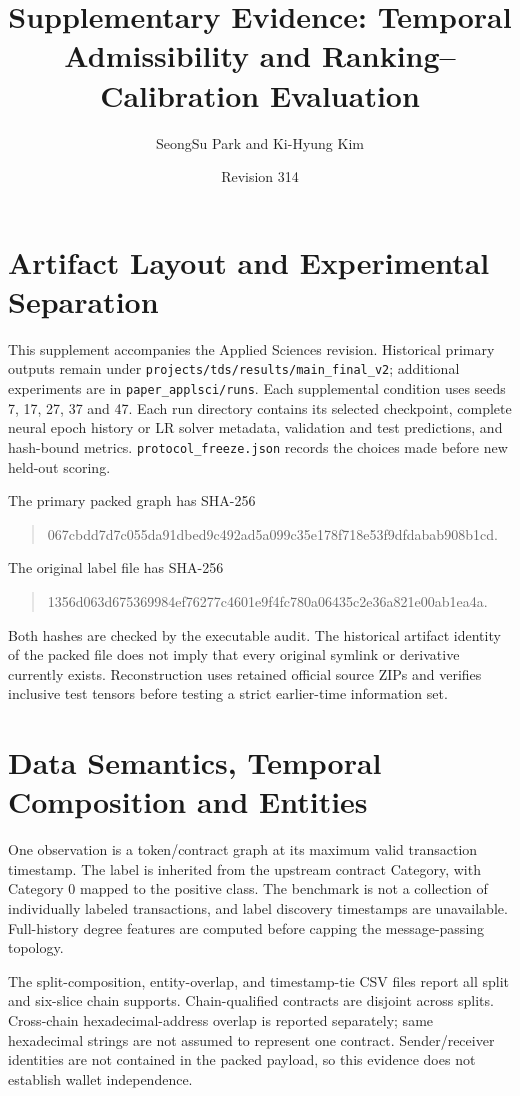\documentclass[11pt]{article}
\title{Supplementary Evidence: Temporal Admissibility and Ranking--Calibration Evaluation}
\author{SeongSu Park and Ki-Hyung Kim}
\date{Revision 314}
\begin{document}
\maketitle
\section{Artifact Layout and Experimental Separation}
This supplement accompanies the Applied Sciences revision. Historical primary outputs remain under \texttt{projects/tds/results/main\_final\_v2}; additional experiments are in \texttt{paper\_applsci/runs}. Each supplemental condition uses seeds 7, 17, 27, 37 and 47. Each run directory contains its selected checkpoint, complete neural epoch history or LR solver metadata, validation and test predictions, and hash-bound metrics. \texttt{protocol\_freeze.json} records the choices made before new held-out scoring.

The primary packed graph has SHA-256
\begin{quote}\ttfamily\small
067cbdd7d7c055da91dbed9c492ad5a099c35e178f718e53f9dfdabab908b1cd.
\end{quote}
The original label file has SHA-256
\begin{quote}\ttfamily\small
1356d063d675369984ef76277c4601e9f4fc780a06435c2e36a821e00ab1ea4a.
\end{quote}
Both hashes are checked by the executable audit. The historical artifact identity of the packed file does not imply that every original symlink or derivative currently exists. Reconstruction uses retained official source ZIPs and verifies inclusive test tensors before testing a strict earlier-time information set.

\section{Data Semantics, Temporal Composition and Entities}
One observation is a token/contract graph at its maximum valid transaction timestamp. The label is inherited from the upstream contract Category, with Category 0 mapped to the positive class. The benchmark is not a collection of individually labeled transactions, and label discovery timestamps are unavailable. Full-history degree features are computed before capping the message-passing topology.

The split-composition, entity-overlap, and timestamp-tie CSV files report all split and six-slice chain supports. Chain-qualified contracts are disjoint across splits. Cross-chain hexadecimal-address overlap is reported separately; same hexadecimal strings are not assumed to represent one contract. Sender/receiver identities are not contained in the packed payload, so this evidence does not establish wallet independence.
\end{document}
